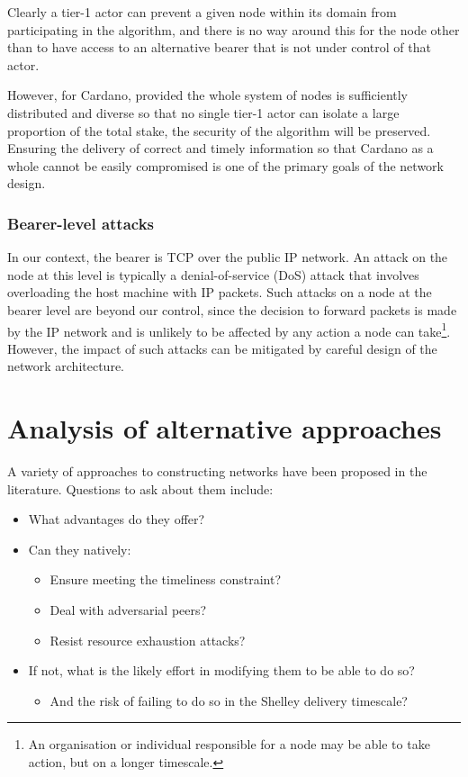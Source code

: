 \documentclass[11pt,a4paper]{article}
\begin{document}
Clearly a tier-1 actor can prevent a given node within its domain from
participating in the algorithm, and there is no way around this for the
node other than to have access to an alternative bearer that is not
under control of that actor.

However, for Cardano, provided the whole system of nodes is sufficiently
distributed and diverse so that no single tier-1 actor can isolate a
large proportion of the total stake, the security of the algorithm will
be preserved. Ensuring the delivery of correct and timely information so
that Cardano as a whole cannot be easily compromised is one of the
primary goals of the network design.

\subsubsection{Bearer-level attacks}
\label{bearer-level-attacks}

In our context, the bearer is TCP over the public IP network. An attack
on the node at this level is typically a denial-of-service (DoS) attack
that involves overloading the host machine with IP packets. Such attacks
on a node at the bearer level are beyond our control, since the decision
to forward packets is made by the IP network and is unlikely to be
affected by any action a node can take\footnote{An organisation or
  individual responsible for a node may be able to take action, but on a
  longer timescale.}. However, the impact of such attacks can be
mitigated by careful design of the network architecture.

\section{Analysis of alternative approaches}
\label{analysis-of-alternative-approaches}

A variety of approaches to constructing networks have been proposed in
the literature. Questions to ask about them include:

\begin{itemize}
\item
  What advantages do they offer?
\item
  Can they natively:

  \begin{itemize}
  \item
    Ensure meeting the timeliness constraint?
  \item
    Deal with adversarial peers?
  \item
    Resist resource exhaustion attacks?
  \end{itemize}
\item
  If not, what is the likely effort in modifying them to be able to do
  so?

  \begin{itemize}
  \item
    And the risk of failing to do so in the Shelley delivery timescale?
  \end{itemize}
\end{itemize}
\end{document}
